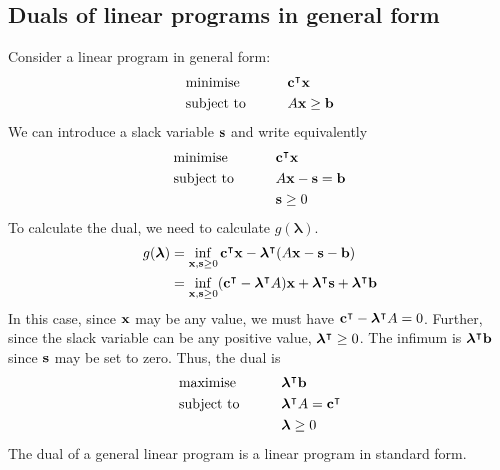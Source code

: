 \subsection{Duals of linear programs in general form}
Consider a linear program in general form:
\begin{alignat*}{2}
	 & \text{minimise}   & \qquad & \vb c^\intercal \vb x \\
	 & \text{subject to} &        & A \vb x \geq \vb b     \\
\end{alignat*}
We can introduce a slack variable \( \vb s \) and write equivalently
\begin{alignat*}{2}
	 & \text{minimise}   & \qquad & \vb c^\intercal \vb x  \\
	 & \text{subject to} &        & A \vb x - \vb s = \vb b \\
	 &                   &        & \vb s \geq 0
\end{alignat*}
To calculate the dual, we need to calculate \( g(\bm \lambda) \).
\begin{align*}
	g(\bm \lambda) & = \inf_{\vb x, \vb s \geq 0} \vb c^\intercal \vb x - \bm \lambda^\intercal (A \vb x - \vb s - \vb b)                                         \\
	               & = \inf_{\vb x, \vb s \geq 0} (\vb c^\intercal - \bm \lambda^\intercal A) \vb x + \bm \lambda^\intercal \vb s + \bm \lambda^\intercal \vb b \\
\end{align*}
In this case, since \( \vb x \) may be any value, we must have \( \vb c^\intercal - \bm \lambda^\intercal A = 0 \).
Further, since the slack variable can be any positive value, \( \bm \lambda^\intercal \geq 0 \).
The infimum is \( \bm \lambda^\intercal \vb b \) since \( \vb s \) may be set to zero.
Thus, the dual is
\begin{alignat*}{2}
	 & \text{maximise}   & \qquad & \bm \lambda^\intercal \vb b                \\
	 & \text{subject to} &        & \bm \lambda^\intercal A = \vb c^\intercal \\
	 &                   &        & \bm \lambda \geq 0
\end{alignat*}
The dual of a general linear program is a linear program in standard form.

